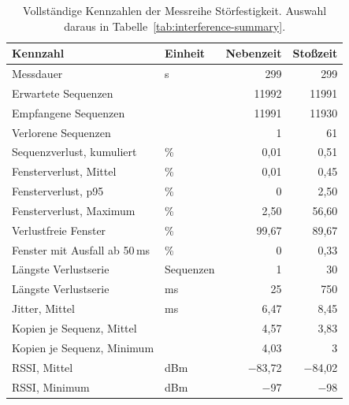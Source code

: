 \begin{table}[htbp]
  \centering
  \small
  \begin{tabular}{llrr}
    \toprule
    Kennzahl & Einheit & Nebenzeit & Stoßzeit \\
    \midrule
    Messdauer & s & 299 & 299 \\
    Erwartete Sequenzen &  & 11992 & 11991 \\
    Empfangene Sequenzen &  & 11991 & 11930 \\
    Verlorene Sequenzen &  & 1 & 61 \\
    Sequenzverlust, kumuliert & \% & 0,01 & 0,51 \\
    Fensterverlust, Mittel & \% & 0,01 & 0,45 \\
    Fensterverlust, p95 & \% & 0 & 2,50 \\
    Fensterverlust, Maximum & \% & 2,50 & 56,60 \\
    Verlustfreie Fenster & \% & 99,67 & 89,67 \\
    Fenster mit Ausfall ab 50\,ms & \% & 0 & 0,33 \\
    Längste Verlustserie & Sequenzen & 1 & 30 \\
    Längste Verlustserie & ms & 25 & 750 \\
    Jitter, Mittel & ms & 6,47 & 8,45 \\
    Kopien je Sequenz, Mittel &  & 4,57 & 3,83 \\
    Kopien je Sequenz, Minimum &  & 4,03 & 3 \\
    RSSI, Mittel & dBm & $-$83,72 & $-$84,02 \\
    RSSI, Minimum & dBm & $-$97 & $-$98 \\
    \bottomrule
\end{tabular}
\caption{Vollständige Kennzahlen der Messreihe Störfestigkeit. Auswahl daraus in Tabelle~\ref{tab:interference-summary}.}
  \label{tab:interference-full}
\end{table}
